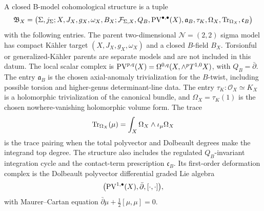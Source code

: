\begin{hypothesis}
\label{hyp:b-model-cohomological-sigma-datum}
A closed B-model cohomological structure is a tuple
\[
  \mathfrak B_X
  =
  \bigl(
    \Sigma,j_\Sigma; X,J_X,g_X,\omega_X,B_X;
    \mathcal F_{\Sigma,X},Q_B,{\rm PV}^{\bullet,\bullet}(X),
    \mathfrak a_B,\tau_K,\Omega_X,{\rm Tr}_{\Omega_X},\mathfrak c_B
  \bigr)
\]
with the following entries.  The parent two-dimensional
\(\mathcal N=(2,2)\) sigma model has compact K\"ahler target
\((X,J_X,g_X,\omega_X)\) and a closed \(B\)-field \(B_X\).  Torsionful or
generalized-K\"ahler parents are separate models and are not included in this
datum.  The local scalar complex is
\({\rm PV}^{p,q}(X)=\Omega^{0,q}(X,\wedge^pT^{1,0}X)\), with
\(Q_B=\bar\partial\).  The entry \(\mathfrak a_B\) is the chosen
axial-anomaly trivialization for the \(B\)-twist, including possible torsion
and higher-genus determinant-line data.  The entry
\(\tau_K:\mathcal O_X\simeq K_X\) is a holomorphic trivialization of the
canonical bundle, and
\(\Omega_X=\tau_K(1)\) is the chosen nowhere-vanishing holomorphic volume
form.  The trace
\[
  {\rm Tr}_{\Omega_X}(\mu)
  =
  \int_X \Omega_X\wedge\iota_\mu\Omega_X
\]
is the trace pairing when the total polyvector and Dolbeault degrees make the
integrand top degree.  The structure also includes the regulated
\(Q_B\)-invariant integration cycle and the contact-term prescription
\(\mathfrak c_B\).  Its first-order deformation complex is the Dolbeault
polyvector differential graded Lie algebra
\[
  \bigl({\rm PV}^{1,\bullet}(X),\bar\partial,[\cdot,\cdot]\bigr),
\]
with Maurer--Cartan equation
\(\bar\partial\mu+\frac12[\mu,\mu]=0\).
\end{hypothesis}

